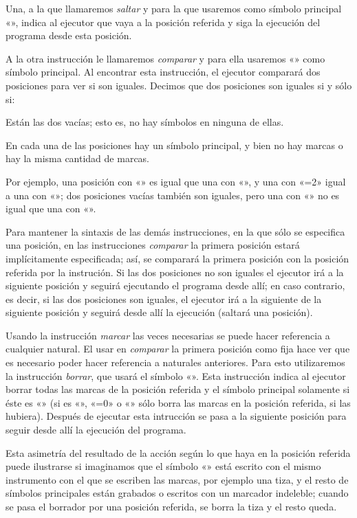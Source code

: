 Una, a la que llamaremos {\it saltar} y para la que usaremos como símbolo principal «\estrella»,
indica al ejecutor que vaya a la posición referida y siga la ejecución del programa desde esta
posición.

A la otra instrucción le llamaremos {\it comparar} y para ella usaremos «» como símbolo
principal. Al encontrar esta instrucción, el ejecutor comparará dos posiciones para ver si son
iguales. Decimos que dos posiciones son iguales si y sólo si:

\listanormal
Están las dos vacías; esto es, no hay símbolos en ninguna de ellas.

En cada una de las posiciones hay un símbolo principal, y bien no hay marcas o hay la misma cantidad
de marcas.
\finlista

Por ejemplo, una posición con «» es igual que una con «\inst{}», y una con
«\inst={2}» igual a una con «\inst{}»; dos posiciones vacías también son iguales, pero una
con «» no es igual que una con «».

Para mantener la sintaxis de las demás instrucciones, en la que sólo se especifica una posición,
en las instrucciones {\it comparar} la primera posición estará implícitamente especificada; así, se
comparará la primera posición con la posición referida por la instrución. Si las dos posiciones no
son iguales el ejecutor irá a la siguiente posición y seguirá ejecutando el programa desde allí; en
caso contrario, es decir, si las dos posiciones son iguales, el ejecutor irá a la siguiente de la
siguiente posición y seguirá desde allí la ejecución (saltará una posición).

%
Usando la instrucción {\it marcar} las veces necesarias se puede hacer referencia a cualquier
natural. El usar en {\it comparar} la primera posición como fija hace ver que es necesario poder
hacer referencia a naturales anteriores. Para esto utilizaremos la instrucción {\it borrar}, que
usará el símbolo «». Esta instrucción indica al ejecutor borrar todas las marcas de la
posición referida y el símbolo principal solamente si éste es «» (si es
«\inst{}», «\inst={0}» o «» sólo borra las marcas en la posición referida, si las
hubiera). Después de ejecutar esta intrucción se pasa a la siguiente posición para seguir desde allí
la ejecución del programa.

Esta asimetría del resultado de la acción según lo que haya en la posición referida puede ilustrarse
si imaginamos que el símbolo «» está escrito con el mismo instrumento con el que se
escriben las marcas, por ejemplo una tiza, y el resto de símbolos principales están grabados o
escritos con un marcador indeleble; cuando se pasa el borrador por una posición referida, se borra
la tiza y el resto queda.

